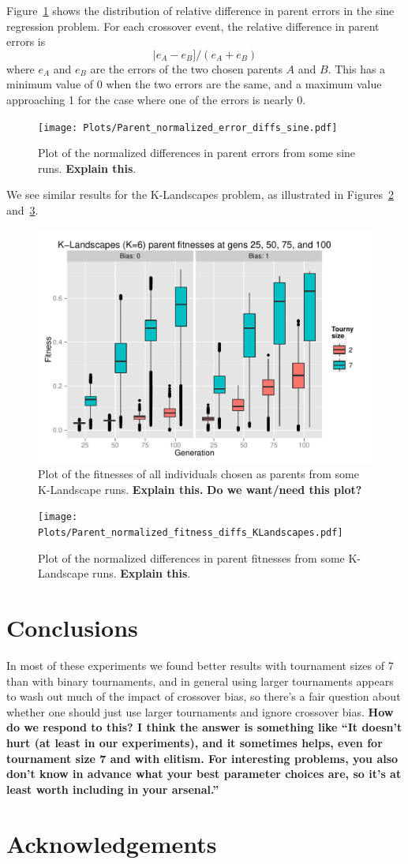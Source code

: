 \documentclass{sig-alternate}
\begin{document}
Figure~\ref{fig:parentDiffsSine} shows the distribution of relative difference in parent errors in the sine regression 
problem. For each crossover event, the relative difference in parent errors is
\[
	|e_A - e_B] / (e_A + e_B)
\]
where $e_A$ and $e_B$ are the errors of the two chosen parents $A$ and $B$. This has a minimum value of 0 when 
the two errors are the same, and a maximum value approaching 1 for the case where one of the errors is nearly 0.

\begin{figure}
\centering
\texttt{[image: Plots/Parent\_normalized\_error\_diffs\_sine.pdf]}
\caption{Plot of the normalized differences in parent errors from some sine runs. \textbf{Explain this}.}
\label{fig:parentDiffsSine}
\end{figure}

We see similar results for the K-Landscapes problem, as illustrated in Figures~\ref{fig:parentFitnessesKLandscapes}
and~\ref{fig:parentDiffsKLandscapes}.

\begin{figure}
\centering
\includegraphics[width=0.45 \textwidth]{Plots/Parent_fitnesses_KLandscapes.pdf}
\caption{Plot of the fitnesses of all individuals chosen as parents from some K-Landscape runs. \textbf{Explain this.}
\textbf{Do we want/need this plot?}}
\label{fig:parentFitnessesKLandscapes}
\end{figure}

\begin{figure}
\centering
\texttt{[image: Plots/Parent\_normalized\_fitness\_diffs\_KLandscapes.pdf]}
\caption{Plot of the normalized differences in parent fitnesses from some K-Landscape runs. \textbf{Explain this}.}
\label{fig:parentDiffsKLandscapes}
\end{figure}

\section{Conclusions} \label{sec:Conclusions}

In most of these experiments we found better results with tournament sizes of 7 than with binary tournaments, and in 
general using larger tournaments appears to wash out much of the impact of crossover bias, so there's a fair question 
about whether one should just use larger tournaments and ignore crossover bias. \textbf{How do we respond to this? I 
think the answer is something like ``It doesn't hurt (at least in our experiments), and it sometimes helps, even for 
tournament size 7 and with elitism. For interesting problems, you also don't know in advance what your best parameter 
choices are, so it's at least worth including in your arsenal.''}

\section*{Acknowledgements}



\end{document}
